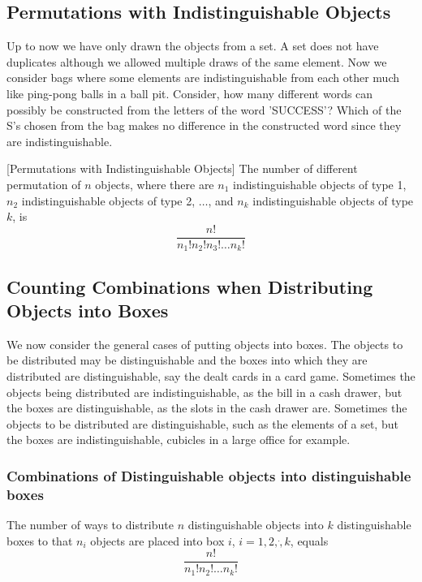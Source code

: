     \subsection {Permutations with Indistinguishable Objects}
Up to now we have only drawn the objects from a set. A set does not have duplicates although we allowed multiple draws of the same element. Now we consider bags where some elements are indistinguishable from each other much like ping-pong balls in a ball pit. Consider, how many different words can possibly be constructed from the letters of the word 'SUCCESS'? Which of the S's chosen from the bag makes no difference in the constructed word since they are indistinguishable.
\begin{theorem}\label{PermDistinguishedBoxesIndistinguishableObjects}[Permutations with Indistinguishable Objects]
The number of different permutation of $n$ objects, where there are $n_1$ indistinguishable objects of type 1, $n_2$ indistinguishable objects of type 2,  $\dots$, and $n_k$ indistinguishable objects of type $k$, is 
$$\frac{n!}{n_1! n_2! n_3! \dots n_k!}$$
\end{theorem}

    \subsection {Counting Combinations when Distributing Objects into Boxes}
We now consider the general cases of putting objects into boxes. The objects to be distributed may be distinguishable and the boxes into which they are distributed are distinguishable, say the dealt cards in a card game. Sometimes the objects being distributed are indistinguishable, as the bill in a cash drawer, but the boxes are distinguishable, as the slots in the cash drawer are. Sometimes the objects to be distributed are distinguishable, such as the elements of a set, but the boxes are indistinguishable, cubicles in a large office for example. 

\subsubsection {Combinations of Distinguishable objects into distinguishable boxes}
\begin{theorem}
The number of ways to distribute $n$ distinguishable objects into $k$ distinguishable boxes to that $n_i$ objects are placed into box $i$, $i=1,2, \dot ,k$, equals
$$ \frac{n!}{n_1!n_2! \dots n_k!}$$
\end {theorem}

